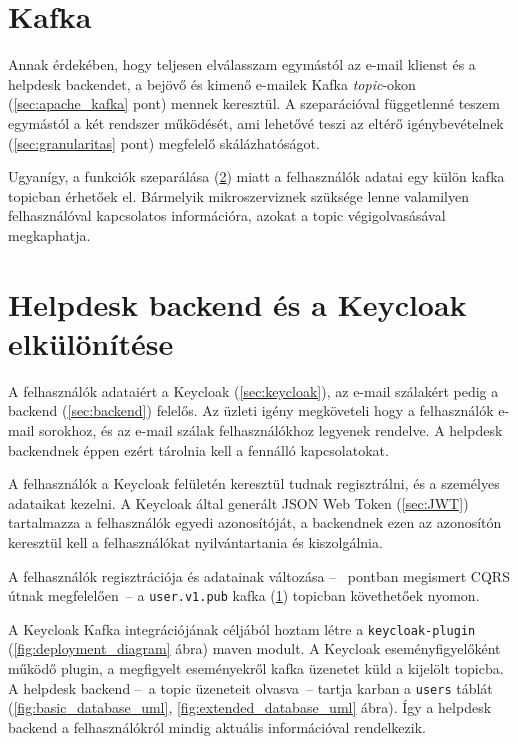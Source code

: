 \section{Kafka}\label{sec:implementacio_kafka}
Annak érdekében, hogy teljesen elválasszam egymástól az e-mail klienst és a helpdesk backendet, a bejövő és kimenő e-mailek Kafka \emph{topic}-okon (\ref{sec:apache_kafka} pont) mennek keresztül. A szeparációval függetlenné teszem egymástól a két rendszer működését, ami lehetővé teszi az eltérő igénybevételnek (\ref{sec:granularitas} pont) megfelelő skálázhatóságot.

Ugyanígy, a funkciók szeparálása (\ref{sec:backend_keycloak_separation}) miatt a felhasználók adatai egy külön kafka topicban érhetőek el. Bármelyik mikroszerviznek szüksége lenne valamilyen felhasználóval kapcsolatos információra, azokat a topic végigolvasásával megkaphatja.



\section{Helpdesk backend és a Keycloak elkülönítése}\label{sec:backend_keycloak_separation}
A felhasználók adataiért a Keycloak (\ref{sec:keycloak}), az e-mail szálakért pedig a backend (\ref{sec:backend}) felelős. Az üzleti igény megköveteli hogy a felhasználók e-mail sorokhoz, és az e-mail szálak felhasználókhoz legyenek rendelve. A helpdesk backendnek éppen ezért tárolnia kell a fennálló kapcsolatokat.

A felhasználók a Keycloak felületén keresztül tudnak regisztrálni, és a személyes adataikat kezelni. A Keycloak által generált JSON Web Token (\ref{sec:JWT}) tartalmazza a felhasználók egyedi azonosítóját, a backendnek ezen az azonosítón keresztül kell a felhasználókat nyilvántartania és kiszolgálnia.

A felhasználók regisztrációja és adatainak változása --~ pontban megismert CQRS útnak megfelelően~-- a \texttt{user.v1.pub} kafka (\ref{sec:implementacio_kafka}) topicban követhetőek nyomon.

A Keycloak Kafka integrációjának céljából hoztam létre a \texttt{keycloak-plugin} (\ref{fig:deployment_diagram} ábra) maven modult. A Keycloak eseményfigyelőként működő plugin, a megfigyelt eseményekről kafka üzenetet küld a kijelölt topicba. A helpdesk backend --~a topic üzeneteit olvasva~-- tartja karban a \texttt{users} táblát (\ref{fig:basic_database_uml}, \ref{fig:extended_database_uml} ábra). Így a helpdesk backend a felhasználókról mindig aktuális információval rendelkezik.

